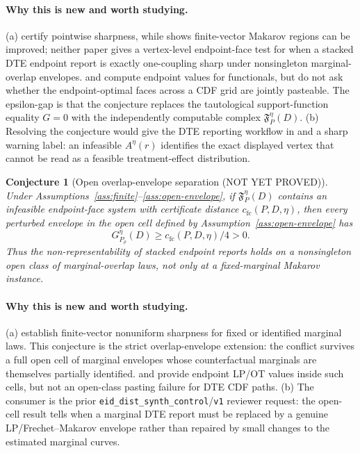 \documentclass[11pt]{article}
\theoremstyle{definition}
\theoremstyle{plain}
\newtheorem{conjecture}{Conjecture}
\theoremstyle{remark}
\begin{document}
\paragraph{Why this is new and worth studying.}
(a) \citet[Section 2 and Lemma 2.3]{FanPark2010} certify pointwise sharpness,
while \citet[Section 2]{FirpoRidder2019} shows finite-vector Makarov regions can
be improved; neither paper gives a vertex-level endpoint-face test for when a
stacked DTE endpoint report is exactly one-coupling sharp under nonsingleton
marginal-overlap envelopes.  \citet[Supplementary Appendix 3]{Russell2021} and
\citet[Sections 2--3]{OberReynolds2023} compute endpoint values for functionals,
but do not ask whether the endpoint-optimal faces across a CDF grid are jointly
pasteable.  The epsilon-gap is that the conjecture replaces the tautological
support-function equality \(G=0\) with the independently computable complex
\(\mathfrak F^\eta_P(D)\).  (b) Resolving the conjecture would give the DTE
reporting workflow in \citet{FanPark2010} and \citet{Lee2024} a sharp warning
label: an infeasible \(A^\eta(r)\) identifies the exact displayed vertex that
cannot be read as a feasible treatment-effect distribution.

\begin{conjecture}[Open overlap-envelope separation (NOT YET PROVED)]\label{conj:open}
Under Assumptions~\ref{ass:finite}--\ref{ass:open-envelope}, if
\(\mathfrak F^\eta_P(D)\) contains an infeasible endpoint-face system with
certificate distance \(c_{\mathrm{fc}}(P,D,\eta)\), then every perturbed envelope
in the open cell defined by Assumption~\ref{ass:open-envelope} has
\[
G^\eta_{P_\rho}(D)\ge c_{\mathrm{fc}}(P,D,\eta)/4>0.
\]
Thus the non-representability of stacked endpoint reports holds on a nonsingleton
open class of marginal-overlap laws, not only at a fixed-marginal Makarov
instance.
\end{conjecture}
\paragraph{Why this is new and worth studying.}
(a) \citet[Section 2]{FirpoRidder2019} establish finite-vector nonuniform
sharpness for fixed or identified marginal laws.  This conjecture is the strict
overlap-envelope extension: the conflict survives a full open cell of marginal
envelopes whose counterfactual marginals are themselves partially identified.
\citet[Supplementary Appendix 3]{Russell2021} and
\citet[Sections 2--3]{OberReynolds2023} provide endpoint LP/OT values inside
such cells, but not an open-class pasting failure for DTE CDF paths.  (b) The
consumer is the prior \texttt{eid\_dist\_synth\_control}/\texttt{v1} reviewer
request: the open-cell result tells when a marginal DTE report must be replaced
by a genuine LP/Frechet--Makarov envelope rather than repaired by small changes
to the estimated marginal curves.
\end{document}
